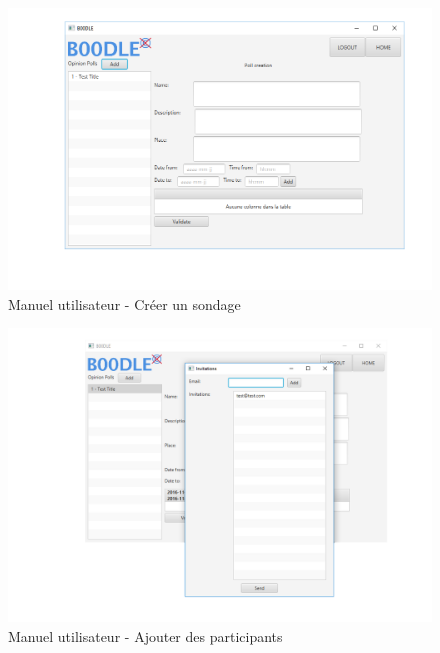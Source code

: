 \documentclass[titlepage]{report}
\begin{document}
\begin{figure}[h]
	\caption{Manuel utilisateur - Créer un sondage}
	\label{um_creerSondage}
	\centering
	\includegraphics[width=\textwidth]{figures/CapturesEcrans/createPoll.png}
\end{figure}

\begin{figure}[h]
	\caption{Manuel utilisateur - Ajouter des participants}
	\label{um_ajouterParticipants}
	\centering
	\includegraphics[width=\textwidth]{figures/CapturesEcrans/addMailsDialog.png}
\end{figure}
\end{document}
